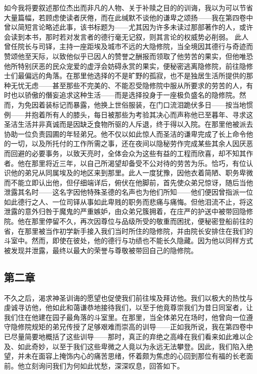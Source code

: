 如今我将要叙述那位杰出而非凡的人物、关于补赎之目的的训诲，我以为可以节省大量篇幅，若顾虑使读者厌倦，而在此缄默不谈他的谦卑之颂扬——我在第四卷中曾以简短言论略述此事，该书标题为——尤其因为许多未读过那部著作的人，或许会读到本书，那时若对发言者的德行毫无记叙，则其言论的权威势必削弱。\newline{} 此人曾任院长与司铎，主持一座距埃及城市不远的大隐修院，当全境因其德行与奇迹而赞颂他至天际，以致他似乎已因人的赞誉之酬报而领取了他劳苦的果实，但他唯恐他所特别厌恶的民众宠爱的虚浮会妨碍永赏的果实，便秘密逃离隐修院，前往隐修士们最偏远的角落。在那里他选择的不是旷野的孤寂，也不是独居生活所提供的那种无忧无虑——甚至那些不完美的、不能忍受隐修院中服从所要求的劳苦的人，有时也以骄傲的僭妄追求这种生活——而是选择投身于一座极负盛名的隐修院。然而，为免因着装标记而暴露，他换上世俗服装，在门口流泪跪伏多日——按当地惯例——并抱着所有人的膝头，每日被那些为考验其决心而声称他已至暮年、寻求这圣洁生活并非真诚而是因缺乏食物所驱的人斥退，终于得以入院。在那里他被派去协助一位负责园圃的年轻弟兄。他不仅以如此惊人而圣洁的谦卑完成了长上命令他的一切，以及所托付的工作所需之事，还在夜间以隐秘劳作完成某些其余人因厌恶而回避的必要事务，以致天亮时，全体会众为这些有益的工程而欣喜，却不知其作者。他在那里将近三年，以自己所渴望却备受不公对待的劳苦为乐。恰巧，有位认识他的弟兄从同属埃及的地区来到那里。此人一度犹豫，因他衣着简陋、职务卑微而不能立即认出他，但仔细端详后，俯伏在他脚前，首先使众弟兄惊讶，随后当他泄露其名时——这名字因他特殊圣德的名声也为他们所知——他们便因曾指派一位如此德行之人、一位司铎从事如此卑贱的职务而悲痛与痛悔。但他泪流不止，将这泄露的意外归咎于魔鬼的严重嫉妒，由众弟兄簇拥着，在庄严的护送中被带回隐修院。他在那里停留不久，再次因尊位与品级所受的敬重而困扰，便秘密登船前往的省，在那里被当作初学新手接入我们当时所住的隐修院，并由院长安排住在我们的斗室中。然而，即使在彼处，他的德行与功绩也不能长久隐藏。因为他以同样方式被发现并泄露，最终以最大的荣誉与尊敬被带回自己的隐修院。\par


\subsection{第二章}

\par

不久之后，渴求神圣训诲的愿望也促使我们前往埃及拜访他。我们以极大的热忱与虔诚寻访他，他如此和蔼谦恭地接待我们，以至于他竟尊崇我们为昔日同室者，让我们住在他建在园子最角落的斗室里。在那里，当全体弟兄在场时，他曾向一位遵守隐修院规矩的弟兄传授了足够艰难而崇高的训导——正如我所说，我在第四卷中已尽量简要地概括了这些训导——那时，真正的弃绝之高峰在我们看来如此难以企及、如此奇妙，以至于我们这些卑微之人竟以为永远无法攀登。因此，我们陷入绝望，并未在面容上掩饰内心的痛苦思绪，怀着颇为焦虑的心回到那位有福的长老面前。他立刻询问我们为何如此忧愁，深深叹息，回答如下。\par

